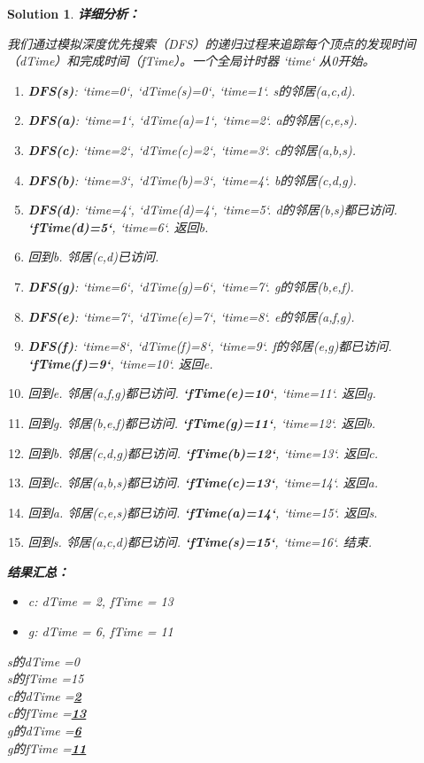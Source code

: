 \documentclass[UTF8]{report}
\newtheorem{solution}{Solution}
\theoremstyle{MyLineTheoremStyle} %
\theoremstyle{MyBlockTheoremStyle} %
\theoremstyle{MySubsubsectionStyle} %
\begin{document}
\begin{solution}
\textbf{详细分析：}

我们通过模拟深度优先搜索（DFS）的递归过程来追踪每个顶点的发现时间（dTime）和完成时间（fTime）。一个全局计时器 `time` 从0开始。

\begin{enumerate}
    \item \textbf{DFS(s)}: `time=0`, `dTime(s)=0`, `time=1`. s的邻居(a,c,d).
    \item \textbf{DFS(a)}: `time=1`, `dTime(a)=1`, `time=2`. a的邻居(c,e,s).
    \item \textbf{DFS(c)}: `time=2`, `dTime(c)=2`, `time=3`. c的邻居(a,b,s).
    \item \textbf{DFS(b)}: `time=3`, `dTime(b)=3`, `time=4`. b的邻居(c,d,g).
    \item \textbf{DFS(d)}: `time=4`, `dTime(d)=4`, `time=5`. d的邻居(b,s)都已访问. \textbf{`fTime(d)=5`}, `time=6`. 返回b.
    \item 回到b. 邻居(c,d)已访问.
    \item \textbf{DFS(g)}: `time=6`, `dTime(g)=6`, `time=7`. g的邻居(b,e,f).
    \item \textbf{DFS(e)}: `time=7`, `dTime(e)=7`, `time=8`. e的邻居(a,f,g).
    \item \textbf{DFS(f)}: `time=8`, `dTime(f)=8`, `time=9`. f的邻居(e,g)都已访问. \textbf{`fTime(f)=9`}, `time=10`. 返回e.
    \item 回到e. 邻居(a,f,g)都已访问. \textbf{`fTime(e)=10`}, `time=11`. 返回g.
    \item 回到g. 邻居(b,e,f)都已访问. \textbf{`fTime(g)=11`}, `time=12`. 返回b.
    \item 回到b. 邻居(c,d,g)都已访问. \textbf{`fTime(b)=12`}, `time=13`. 返回c.
    \item 回到c. 邻居(a,b,s)都已访问. \textbf{`fTime(c)=13`}, `time=14`. 返回a.
    \item 回到a. 邻居(c,e,s)都已访问. \textbf{`fTime(a)=14`}, `time=15`. 返回s.
    \item 回到s. 邻居(a,c,d)都已访问. \textbf{`fTime(s)=15`}, `time=16`. 结束.
\end{enumerate}

\textbf{结果汇总：}
\begin{itemize}
    \item c: dTime = 2, fTime = 13
    \item g: dTime = 6, fTime = 11
\end{itemize}

\hrulefill

s的dTime =0\\
s的fTime =15\\
c的dTime =\underline{\hspace{2cm}\textbf{2}\hspace{2cm}}\\
c的fTime =\underline{\hspace{2cm}\textbf{13}\hspace{2cm}}\\
g的dTime =\underline{\hspace{2cm}\textbf{6}\hspace{2cm}}\\
g的fTime =\underline{\hspace{2cm}\textbf{11}\hspace{2cm}}
\end{solution}
\end{document}
